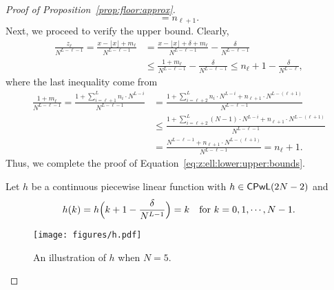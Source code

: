 \documentclass[11pt,a4paper]{article}
\begin{document}
\begin{proof}[Proof of Proposition~\ref{prop:floor:approx}]
\begin{equation*}
    =  n_{\ell+1}.
\end{equation*}
Next, we proceed to verify the upper bound. Clearly, 
\begin{equation*}
\begin{split}
        \frac{z_\ell}{N^{L-\ell-1}}
    = \frac{x - \lfloor x\rfloor + m_\ell}{N^{L-\ell-1}}
    &= \frac{x - \lfloor x\rfloor +\delta + m_\ell}{N^{L-\ell-1}}
   - \frac{\delta}{N^{L-\ell-1}}
   \\& \le \frac{1 + m_\ell}{N^{L-\ell-1}}
   - \frac{\delta}{N^{L-\ell-1}}
    \le  n_\ell+1-\frac{\delta}{N^{L-\ell}},
\end{split}
\end{equation*}
where the last inequality come from
\begin{equation*}
    \begin{split}
        \frac{1 + m_\ell}{N^{L-\ell-1}}
    =\frac{1 + \sum_{i=\ell+1}^{L}
    n_i\cdot N^{L-i}}{N^{L-\ell-1}}
    & =\frac{1 + \sum_{i=\ell+2}^{L}
    n_i\cdot N^{L-i}+ n_{\ell+1}\cdot N^{L-(\ell+1)}}{N^{L-\ell-1}}
   \\&  \le 
   \frac{1 + \sum_{i=\ell+2}^{L}
    (N-1)\cdot N^{L-i}+ n_{\ell+1}\cdot N^{L-(\ell+1)}}{N^{L-\ell-1}}
    \\&  =
   \frac{N^{L-\ell-1} + n_{\ell+1}\cdot N^{L-(\ell+1)}}{N^{L-\ell-1}}
    =  n_\ell+1.
    \end{split}
\end{equation*}
Thus, we complete the proof of Equation~\eqref{eq:z:ell:lower:upper:bounds}.

Let $h$ be a continuous piecewise linear function with $h\in \textsf{\textup{CPwL}}(2N-2)$ and
\begin{equation*}
    h(k)=h\Big(k+1-\frac{\delta}{N^{L-1}}\Big)=k\quad \textnormal{for $k=0,1,\mathinner{\mkern-0.1mu\cdotp\mkern-0.3mu\cdotp\mkern-0.3mu\cdotp\mkern-0.1mu},N-1$}.
\end{equation*}

\begin{figure}[ht]
    \centering   \texttt{[image: figures/h.pdf]}
\caption{An illustration of $h$ when $N=5$.}
    \label{fig:h}
\end{figure}


\end{proof}
\end{document}

